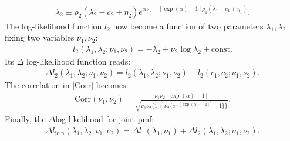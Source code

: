 \documentclass[submission, Phys]{SciPost}
\begin{document}
\begin{appendix}
\begin{align}
\lambda_2 \equiv \rho_2(\lambda_2 - c_2 + \eta_2)e^{\alpha \nu_1 - [\exp(\alpha)-1]\rho_1(\lambda_1-c_1+\eta_1)}.
\end{align}
The log-likelihood function $l_2$ now become a function of two parameters $\lambda_1, \lambda_2$ fixing two variables $\nu_1, \nu_2$:
\begin{align}
l_2(\lambda_1,\lambda_2; \nu_1,\nu_2) =-\lambda_2 + \nu_2\log \lambda_2 + \text{const}.
\end{align}
Its $\Delta$ log-likelihood function reads:
\begin{align}
\Delta l_2(\lambda_1,\lambda_2; \nu_1,\nu_2)=l_2(\lambda_1,\lambda_2; \nu_1,\nu_2)-l_2(c_1,c_2; \nu_1,\nu_2).
\end{align}
The correlation in \ref{Corr} becomes: 
\begin{align}
\text{Corr}(\nu_1,\nu_2) = \frac{\nu_1\nu_2[\exp(\alpha)-1]}{\sqrt{\nu_1\nu_2\{1+\nu_2\{e^{\nu_1[\exp(\alpha)-1]^2}-1\}\}}}.
\end{align}
Finally, the $\Delta$log-likelihood for joint pmf:
\begin{align}
\Delta l_{\text{join}}(\lambda_1,\lambda_2;\nu_1,\nu_2)=\Delta l_1(\lambda_1;\nu_1) + \Delta l_2(\lambda_1,\lambda_2; \nu_1,\nu_2).
\end{align}
\end{appendix}





\nolinenumbers
\end{document}
